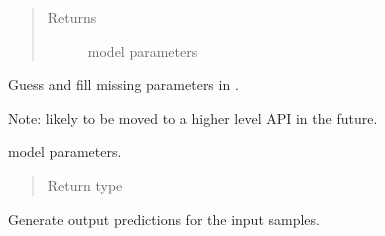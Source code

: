 \documentclass[letterpaper,10pt,english]{sphinxmanual}
\begin{document}
\begin{fulllineitems}
\begin{fulllineitems}
\begin{quote}
\begin{description}
\item[{Returns}] \leavevmode
model parameters

\end{description}\end{quote}

\end{fulllineitems}


\begin{fulllineitems}
\label{\detokenize{matchzoo.engine:matchzoo.engine.base_model.BaseModel.guess_and_fill_missing_params}}
Guess and fill missing parameters in {\hyperref[\detokenize{matchzoo.engine:matchzoo.engine.base_model.BaseModel.params}]{}}.

Note: likely to be moved to a higher level API in the future.

\end{fulllineitems}


\begin{fulllineitems}
\label{\detokenize{matchzoo.engine:matchzoo.engine.base_model.BaseModel.params}}
 \textendash{} model parameters.
\begin{quote}\begin{description}
\item[{Return type}] \leavevmode
{\hyperref[\detokenize{matchzoo.engine:matchzoo.engine.param_table.ParamTable}]{}}

\end{description}\end{quote}

\end{fulllineitems}


\begin{fulllineitems}
\label{\detokenize{matchzoo.engine:matchzoo.engine.base_model.BaseModel.predict}}
Generate output predictions for the input samples.


\end{fulllineitems}
\end{fulllineitems}
\end{document}
